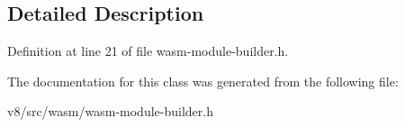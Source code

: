 \subsection{Detailed Description}


Definition at line 21 of file wasm-\/module-\/builder.\+h.



The documentation for this class was generated from the following file\+:\begin{DoxyCompactItemize}
\item 
v8/src/wasm/wasm-\/module-\/builder.\+h\end{DoxyCompactItemize}
